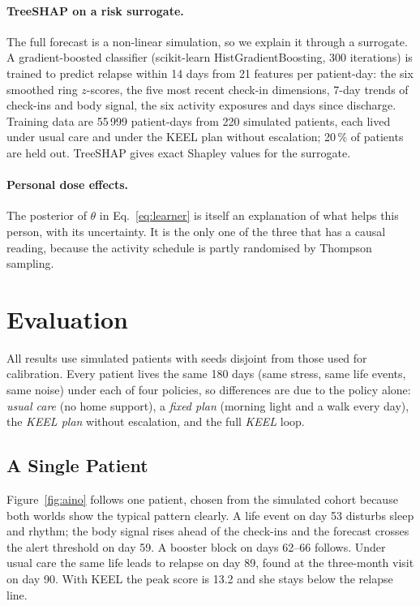 \documentclass[11pt,a4paper]{article}
\begin{document}
\paragraph{TreeSHAP on a risk surrogate.} The full forecast is a non-linear simulation, so we explain it through a surrogate. A gradient-boosted classifier (scikit-learn HistGradientBoosting, 300 iterations) is trained to predict relapse within 14 days from 21 features per patient-day: the six smoothed ring $z$-scores, the five most recent check-in dimensions, 7-day trends of check-ins and body signal, the six activity exposures and days since discharge. Training data are 55\,999 patient-days from 220 simulated patients, each lived under usual care and under the KEEL plan without escalation; 20\,\% of patients are held out. TreeSHAP \cite{lundberg2020} gives exact Shapley values for the surrogate.

\paragraph{Personal dose effects.} The posterior of $\theta$ in Eq.~\eqref{eq:learner} is itself an explanation of what helps this person, with its uncertainty. It is the only one of the three that has a causal reading, because the activity schedule is partly randomised by Thompson sampling.

\section{Evaluation}

All results use simulated patients with seeds disjoint from those used for calibration. Every patient lives the same 180 days (same stress, same life events, same noise) under each of four policies, so differences are due to the policy alone: \emph{usual care} (no home support), a \emph{fixed plan} (morning light and a walk every day), the \emph{KEEL plan} without escalation, and the full \emph{KEEL} loop.

\subsection{A Single Patient}

Figure~\ref{fig:aino} follows one patient, chosen from the simulated cohort because both worlds show the typical pattern clearly. A life event on day 53 disturbs sleep and rhythm; the body signal rises ahead of the check-ins and the forecast crosses the alert threshold on day 59. A booster block on days 62--66 follows. Under usual care the same life leads to relapse on day 89, found at the three-month visit on day 90. With KEEL the peak score is 13.2 and she stays below the relapse line.
\end{document}

